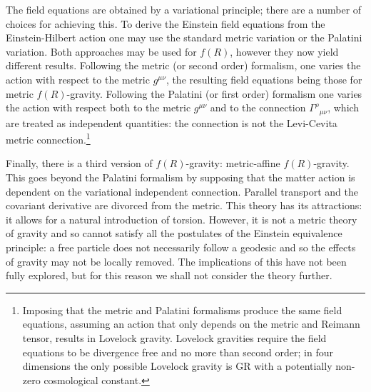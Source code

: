 The field equations are obtained by a variational principle; there are a number of choices for achieving this. To derive the Einstein field equations from the Einstein-Hilbert action one may use the standard metric variation or the Palatini variation\cite{Misner1973}. Both approaches may be used for $f(R)$, however they now yield different results\cite{Sotiriou2010, DeFelice2010}. Following the metric (or second order) formalism, one varies the action with respect to the metric $g^{\mu\nu}$, the resulting field equations being those for metric $f(R)$-gravity. Following the Palatini (or first order) formalism one varies the action with respect both to the metric $g^{\mu\nu}$ and to the connection ${\Gamma^\rho}_{\mu\nu}$, which are treated as independent quantities: the connection is not the Levi-Cevita metric connection.\footnote{Imposing that the metric and Palatini formalisms produce the same field equations, assuming an action that only depends on the metric and Reimann tensor, results in Lovelock gravity\cite{Exirifard2008}. Lovelock gravities require the field equations to be divergence free and no more than second order; in four dimensions the only possible Lovelock gravity is GR with a potentially non-zero cosmological constant\cite{Lovelock1970, Lovelock1971, Lovelock1972}.}

Finally, there is a third version of $f(R)$-gravity: metric-affine $f(R)$-gravity\cite{Sotiriou2007, Sotiriou2007b}. This goes beyond the Palatini formalism by supposing that the matter action is dependent on the variational independent connection. Parallel transport and the covariant derivative are divorced from the metric. This theory has its attractions: it allows for a natural introduction of torsion. However, it is not a metric theory of gravity and so cannot satisfy all the postulates of the Einstein equivalence principle\cite{Will2006}: a free particle does not necessarily follow a geodesic and so the effects of gravity may not be locally removed\cite{Exirifard2008}. The implications of this have not been fully explored, but for this reason we shall not consider the theory further.

